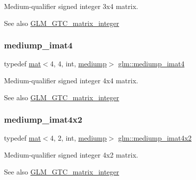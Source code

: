 Medium-\/qualifier signed integer 3x4 matrix. \begin{DoxySeeAlso}{See also}
\hyperlink{group__gtc__matrix__integer}{G\+L\+M\+\_\+\+G\+T\+C\+\_\+matrix\+\_\+integer} 
\end{DoxySeeAlso}
\mbox{\label{group__gtc__matrix__integer_ga3ce415f7039ec7f1ad5bffa14d226e80}} 
\subsubsection{\texorpdfstring{mediump\+\_\+imat4}{mediump\_imat4}}
{\footnotesize\ttfamily typedef \hyperlink{structglm_1_1mat}{mat}$<$4, 4, int, \hyperlink{namespaceglm_a36ed105b07c7746804d7fdc7cc90ff25a6416f3ea0c9025fb21ed50c4d6620482}{mediump}$>$ \hyperlink{group__gtc__matrix__integer_ga3ce415f7039ec7f1ad5bffa14d226e80}{glm\+::mediump\+\_\+imat4}}

Medium-\/qualifier signed integer 4x4 matrix. \begin{DoxySeeAlso}{See also}
\hyperlink{group__gtc__matrix__integer}{G\+L\+M\+\_\+\+G\+T\+C\+\_\+matrix\+\_\+integer} 
\end{DoxySeeAlso}
\mbox{\label{group__gtc__matrix__integer_ga536fe339834f7e764672c22c63ec543b}} 
\subsubsection{\texorpdfstring{mediump\+\_\+imat4x2}{mediump\_imat4x2}}
{\footnotesize\ttfamily typedef \hyperlink{structglm_1_1mat}{mat}$<$4, 2, int, \hyperlink{namespaceglm_a36ed105b07c7746804d7fdc7cc90ff25a6416f3ea0c9025fb21ed50c4d6620482}{mediump}$>$ \hyperlink{group__gtc__matrix__integer_ga536fe339834f7e764672c22c63ec543b}{glm\+::mediump\+\_\+imat4x2}}

Medium-\/qualifier signed integer 4x2 matrix. \begin{DoxySeeAlso}{See also}
\hyperlink{group__gtc__matrix__integer}{G\+L\+M\+\_\+\+G\+T\+C\+\_\+matrix\+\_\+integer} 
\end{DoxySeeAlso}
\mbox{\label{group__gtc__matrix__integer_ga213644b63e6ee8ac783fd9a75e3c5abb}} 

